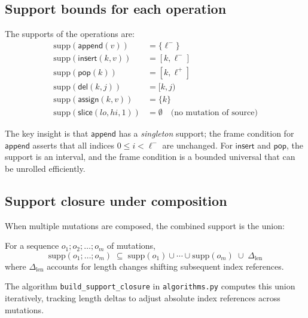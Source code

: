 \documentclass[11pt]{article}
\newcommand{\lenvar}[1]{\ell_{#1}}
\newcommand{\idx}{i}
\newcommand{\MutApp}{\ensuremath{\mathsf{append}}}
\newcommand{\MutIns}{\ensuremath{\mathsf{insert}}}
\newcommand{\MutPop}{\ensuremath{\mathsf{pop}}}
\newcommand{\MutDel}{\ensuremath{\mathsf{del}}}
\newcommand{\MutSlice}{\ensuremath{\mathsf{slice}}}
\newcommand{\MutAssign}{\ensuremath{\mathsf{assign}}}
\newcommand{\prestate}[1]{#1^{-}}
\newcommand{\poststate}[1]{#1^{+}}
\begin{document}
\subsection{Support bounds for each operation}

\begin{proposition}\label{prop:supports}
The supports of the operations are:
\begin{align*}
  \mathrm{supp}(\MutApp(v))      &= \{\prestate{\lenvar{}}\}\\
  \mathrm{supp}(\MutIns(k,v))    &= [k,\prestate{\lenvar{}}]\\
  \mathrm{supp}(\MutPop(k))      &= [k,\poststate{\lenvar{}}]\\
  \mathrm{supp}(\MutDel(k,j))    &= [k, j)\\
  \mathrm{supp}(\MutAssign(k,v)) &= \{k\}\\
  \mathrm{supp}(\MutSlice(lo,hi,1)) &= \emptyset \quad\text{(no mutation of source)}
\end{align*}
\end{proposition}

The key insight is that \MutApp{} has a \emph{singleton} support; the frame
condition for \MutApp{} asserts that all indices $0 \leq \idx < \prestate{\lenvar{}}$
are unchanged.  For \MutIns{} and \MutPop{}, the support is an interval, and
the frame condition is a bounded universal that can be unrolled efficiently.

\subsection{Support closure under composition}

When multiple mutations are composed, the combined support is the union:

\begin{proposition}\label{prop:supcomp}
For a sequence $o_1; o_2; \ldots; o_m$ of mutations,
\[
  \mathrm{supp}(o_1;\ldots;o_m) \;\subseteq\;
  \mathrm{supp}(o_1) \cup \cdots \cup \mathrm{supp}(o_m)
  \;\cup\; \Delta_{\mathrm{len}}
\]
where $\Delta_{\mathrm{len}}$ accounts for length changes shifting subsequent
index references.
\end{proposition}

The algorithm \texttt{build\_support\_closure} in \texttt{algorithms.py}
computes this union iteratively, tracking length deltas to adjust absolute
index references across mutations.

\end{document}
